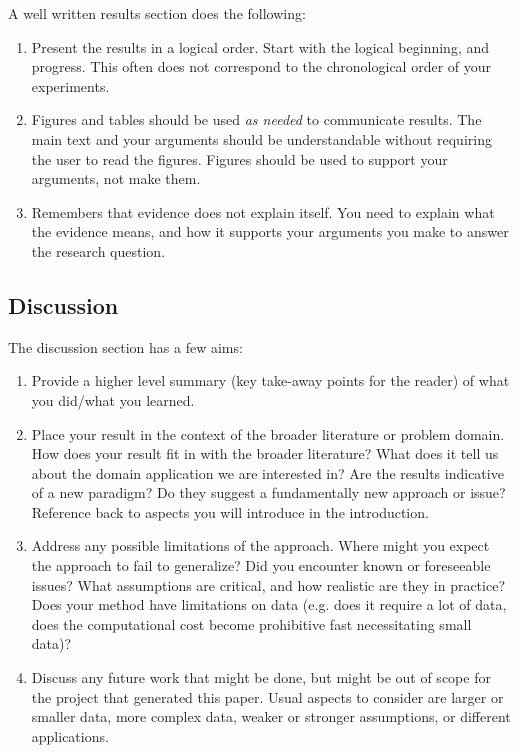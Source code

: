 \documentclass[]{article}
\begin{document}
A well written results section does the following:
\begin{enumerate}
    \item Present the results in a logical order. Start with the logical beginning, and progress. This often does not correspond to the chronological order of your experiments.
    \item Figures and tables should be used \emph{as needed} to communicate results. The main text and your arguments should be understandable without requiring the user to read the figures. Figures should be used to support your arguments, not make them.
    \item Remembers that evidence does not explain itself. You need to explain what the evidence means, and how it supports your arguments you make to answer the research question.
\end{enumerate}

\subsection{Discussion}

The discussion section has a few aims:
\begin{enumerate}
    \item Provide a higher level summary (key take-away points for the reader) of what you did/what you learned.
    \item Place your result in the context of the broader literature or problem domain. How does your result fit in with the broader literature? What does it tell us about the domain application we are interested in? Are the results indicative of a new paradigm? Do they suggest a fundamentally new approach or issue? Reference back to aspects you will introduce in the introduction.
    \item Address any possible limitations of the approach. Where might you expect the approach to fail to generalize? Did you encounter known or foreseeable issues?
          What assumptions are critical, and how realistic are they in practice? Does your method have limitations on data (e.g. does it require a lot of data, does the computational cost become prohibitive fast necessitating small data)?
    \item Discuss any future work that might be done, but might be out of scope for the project that generated this paper. Usual aspects to consider are larger or smaller data, more complex data, weaker or stronger assumptions, or different applications.
\end{enumerate}
\end{document}
